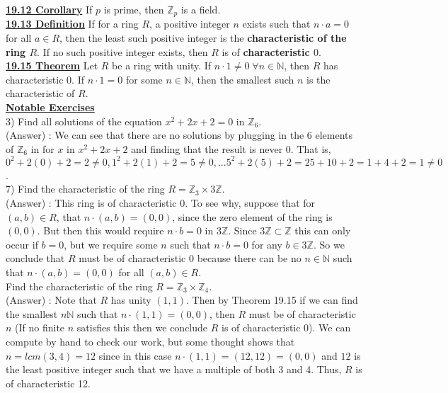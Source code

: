 \documentclass[12pt, letterpaper]{article}
\begin{document}
\noindent \underline{\bf 19.12 Corollary} If $p$ is prime, then $\mathbb{Z}_p$ is a field. \\

\noindent \underline{\bf 19.13 Definition} If for a ring $R$, a positive integer $n$ exists such that $n \cdot a = 0$ for all $a \in R$, then the least such positive integer is the {\bf characteristic of the ring $R$}. If no such positive integer exists, then $R$ is of {\bf characteristic $0$}. \\

\noindent \underline{\bf 19.15 Theorem} Let $R$ be a ring with unity. If $n \cdot 1 \neq 0 \; \forall n \in \mathbb{N}$, then $R$ has characteristic 0. If $n \cdot 1 = 0 $ for some $n \in \mathbb{N}$, then the smallest such $n$ is  the characteristic of $R$. \\

\noindent \underline{\bf Notable Exercises}\\

3) Find all solutions of the equation $x^2 + 2x +2 = 0$ in $\mathbb{Z}_6$. \\

(Answer) : We can see that there are no solutions by plugging in the 6 elements of $\mathbb{Z}_6$ in for $x$ in $x^2 + 2x + 2$ and finding that the result is never 0. That is, $0^2 + 2(0) + 2 = 2 \neq 0, 1^2 +2(1) + 2 = 5 \neq 0, ... 5^2 + 2(5) + 2 = 25 + 10 + 2 = 1 + 4 +2 = 1 \neq 0$. \\

7) Find the characteristic of the ring $R = \mathbb{Z}_3 \times 3 \mathbb{Z}$. \\

(Answer) : This ring is of characteristic 0. To see why, suppose that for $(a,b) \in R$, that $n \cdot (a,b) = (0,0)$, since the zero element of the ring is $(0,0)$. But then this would require $n \cdot b = 0$ in $3\mathbb{Z}$. Since $3\mathbb{Z} \subset \mathbb{Z}$ this can only occur if $b = 0$, but we require some $n$ such that $n \cdot b = 0$ for any $b \in 3 \mathbb{Z}$. So we conclude that $R$ must be of characteristic 0 because there can be no $n \in \mathbb{N}$ such that $n \cdot (a,b) = (0,0)$ for all $(a,b) \in R$. \\

Find the characteristic of the ring $R = \mathbb{Z}_3 \times \mathbb{Z}_4$. \\

(Answer) : Note that $R$ has unity $(1,1)$. Then by Theorem 19.15 if we can find the smallest $n \mathbb{N}$ such that $n \cdot (1,1) = (0,0)$, then $R$ must be of characteristic $n$ (If no finite $n$ satisfies this then we conclude $R$ is of characteristic 0). We can compute by hand to check our work, but some thought shows that $n = lcm(3,4) = 12$ since in this case $n \cdot (1,1) = (12,12) = (0,0)$ and $12$ is the least positive integer such that we have a multiple of both 3 and 4. Thus, $R$ is of characteristic 12. \\
\end{document}

